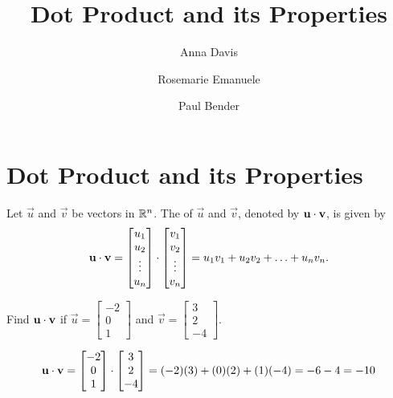 \documentclass{ximera}
\author{Anna Davis \and Rosemarie Emanuele \and Paul Bender} \title{Dot Product and its Properties} \license{CC-BY 4.0}
\begin{document}
\begin{abstract}
\end{abstract}
\maketitle

\section*{Dot Product and its Properties}

\begin{definition}\label{def:dotproduct}
  Let $\vec{u}$ and $\vec{v}$ be vectors in $\mathbb{R}^n$.  The  of $\vec{u}$ and $\vec{v}$, denoted by
  $\mathbf{u}\cdot \mathbf{v}$, is given by
  \begin{align*}
    \mathbf{u}\cdot\mathbf{v}=\begin{bmatrix}u_1\\u_2\\\vdots\\u_n\end{bmatrix}\cdot\begin{bmatrix}v_1\\v_2\\\vdots\\v_n\end{bmatrix}=u_1v_1+u_2v_2+\ldots+u_nv_n.
  \end{align*}
\end{definition}

\begin{example}\label{ex:dotex}
  Find $\mathbf{u}\cdot \mathbf{v}$ if
  $\vec{u}=\begin{bmatrix}-2\\0\\1\end{bmatrix}$ and
  $\vec{v}=\begin{bmatrix}3\\2\\-4\end{bmatrix}$.

  \begin{explanation}
    $$\mathbf{u}\cdot\mathbf{v}=\begin{bmatrix}-2\\0\\1\end{bmatrix}\cdot\begin{bmatrix}3\\2\\-4\end{bmatrix}=(-2)(3)+(0)(2)+(1)(-4)=-6-4=-10$$
  \end{explanation}
\end{example}
\end{document}
